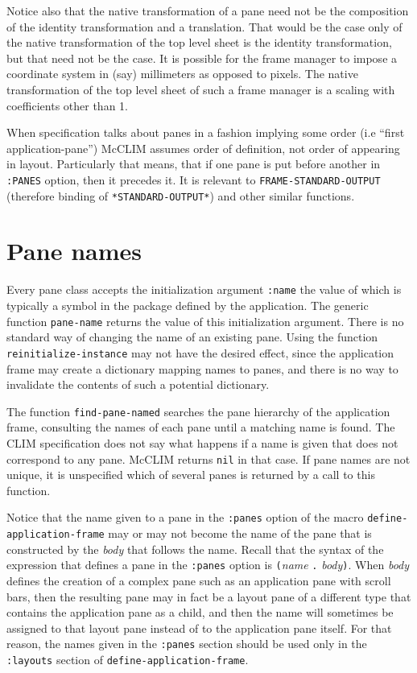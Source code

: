 Notice also that the native transformation of a pane need not be the
composition of the identity transformation and a translation.  That
would be the case only of the native transformation of the top level
sheet is the identity transformation, but that need not be the case.  It
is possible for the frame manager to impose a coordinate system in (say)
millimeters as opposed to pixels.  The native transformation of the top
level sheet of such a frame manager is a scaling with coefficients other
than 1.


When specification talks about panes in a fashion implying some order
(i.e ``first application-pane'') McCLIM assumes order of definition,
not order of appearing in layout. Particularly that means, that if one
pane is put before another in \texttt{:PANES} option, then it precedes
it. It is relevant to \texttt{FRAME-STANDARD-OUTPUT} (therefore
binding of \texttt{*STANDARD-OUTPUT*}) and other similar functions.

\section{Pane names}

Every pane class accepts the initialization argument \texttt{:name}
the value of which is typically a symbol in the package defined by the
application.  The generic function \texttt{pane-name} returns the
value of this initialization argument.  There is no standard way of
changing the name of an existing pane.  Using the function
\texttt{reinitialize-instance} may not have the desired effect, since
the application frame may create a dictionary mapping names to panes,
and there is no way to invalidate the contents of such a potential
dictionary.

The function \texttt{find-pane-named} searches the pane hierarchy of
the application frame, consulting the names of each pane until a
matching name is found.  The CLIM specification does not say what
happens if a name is given that does not correspond to any pane.
McCLIM returns \texttt{nil} in that case.  If pane names are not
unique, it is unspecified which of several panes is returned by a call
to this function.

Notice that the name given to a pane in the \texttt{:panes} option of
the macro \texttt{define-application-frame} may or may not become the
name of the pane that is constructed by the \textit{body} that follows
the name.  Recall that the syntax of the expression that defines a
pane in the \texttt{:panes} option is \texttt{(}\textit{name}
\texttt{.} \textit{body}\texttt{)}.  When \textit{body} defines the
creation of a complex pane such as an application pane with scroll
bars, then the resulting pane may in fact be a layout pane of a
different type that contains the application pane as a child, and then
the name will sometimes be assigned to that layout pane instead of to
the application pane itself.  For that reason, the names given in the
\texttt{:panes} section should be used only in the \texttt{:layouts}
section of \texttt{define-application-frame}.

